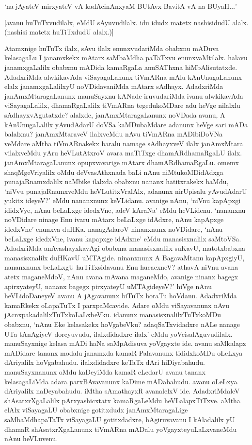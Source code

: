 \begin{shloka}
`na jAyateV mirxyateV vA kadAcinAnx\s yaM BUtAvx BavitA vA na BUyaH$\ldots$' 
\end{shloka}

[avanu huTuTxvudilalx, eMdU sAyuvudilalx. idu idudx matetx nashisidudU alalx. (nashisi matetx huTiTxdudU alalx.)]

Atamxnige huTuTx ilalx, sAvu ilalx enunxvudariMda obabxnu mADuva kelasagaLu I janamxkekx mAtarx saMbaMdha paTaTxvu enunxvaMtilalx. halavu janamxgaLalilx obabxnu mADida kamaRgaLa anuSAThxna hiMbAlisutatxde. AdadxriMda alwkikavAda viSayagaLanunx tiVmARna mAlu kAnUnugaLanunx elalx janamxgaLalilxyU noVDidavaniMda mAtarx sAdhayx. AdadxriMda janAmxMtaragaLanunx manuSayxnu kANade iruvudariMda ivanu alwkikavAda viSayagaLalilx, dhamaRgaLalilx tiVmARna tegedukoMDare adu heVge nilalxlu sAdhayxvAgutatxde? alalxde, janAmxMtaragaLanunx noVDada avanu, A kAnUnugaLalilx yAvudAdarU doVSa kaMDubaMdare adanunx heVge sari mADa balalxnu? janAmxMtaraveV ilalxveMdu nAvu tiVmARna mADibiDoVNa veMdare aMtha tiVmARnakekx baralu namage sAdhayxveV ilalx janAmxMtara vilalxveMdu yAru heVLutAtxroV avara maTiTxge dhamARdhamaRgaLU ilalx. janAmxMtaragaLanunx opupxvavarige mAtarx dhamARdhamaRgaLu. omemx shaqMgeVriyalilx oMdu deVvasAthxnada baLi nAnu niMtukoMDidAdxga punajaRnamxdalilx naMbike ilalxda obabxnu nananx hatitxrakekx baMdu, `niVvu punajaRnamxveMdu heVLutitxVralAlx, adanunx nirUpisalu yAvudAdarU yukitx ideyeV?' eMdu nananxnunx keVLidanu. avanige nAnu, `niVnu kapApxgi ididxVye, nAnu beLaLxge idedxVne, adeV kAraNa' eMdu heVLidenu. `nananxnu noVDidare ninage Enu ivaru mAtarx beLaLxge idAdxre, nAnu kapApxge idedxVne' enunxva duHKa. nanagAdaroV ninanxnunx noVDidare, `nAnu beLaLxge idedxVne, ivanu kapapxge idAdxne' eMdu manasisxnalilx saMtoVSa. AdadxriMda anAvashayxkavAgi obabxna manasisxnalilx suKavU, matotxbabxna manasisxnalilx duHKavU uMTAgide. ninanxnunx A BagavaMtanu kapApxgiyU, nananxnunx beLaLxgU huTiTxsidavanu Enu hucacxneV? athavA niVnu avana atetx maganeMdoV, nAnu avana mAvana maganeMdo, avanige ninanx bagegx apirxyateyU, nananx bagegx pirxyateyU uMTAgideyeV?' hiVge nAnu heVLidoDaneyeV avanu A jAgavanunx biTuTx horaTu hoVdanu. AdadxriMda kamaRkekx oLapaTuTx I parxpaMcavide. Adare oMdu viSayavanunx nAvu jAcnxpakadalilxTuTxkoLaLxbeVku. idanunx manasisxnalilxTuTxkoMDu obabxnu, `nAnu Eke kelasakekx hoVgabeVku? adaqSaTxvidadxre nALe nanage UTa tAnAgiyeV doreyuvudu, ilalxdidadxre ilalx' eMdu yoVcisalAguvudilalx. manuSayxnige kelasa mADi haNa saMpAdisuva yoVgayxte ide. avanu saMkalapx mADidare tananx modalu janamxda kamaR Palavanunx tididxkoMDu oLeLxya dAriyalilx hoVgabahudu. ilalxdidadxre keTaTx dAri hiDiyabahudu. manuSayxnanunx oMdu kaDeyiMda kamaR eLedarU avanu tananx kelasagaLiMda adara parxBAvavanunx kaDime mADabahudu. avanu oLeLxya dAriyalilx naDeyabahudu. iMtha sAmathayxR avanalelxV ide. AdadxriMdaleV shAsatxrXgaLalilx pArxyashicxtatx kamaRgaLeMdu heVLalapxTiTxve. aMtha elAlx viSayagaLU obabxnige gotitxdudx janAmxMtaragaLige saMbaMdhapaTaTx viSayagaLU gotitxdadxre, hAgiruvavanu I kAladalilx yU dhamaR shAsatxrXgaLanunx tiVmARna mADalu yoVgayxteyuLaLxvaneMdu nAnu heVLuvenu.

